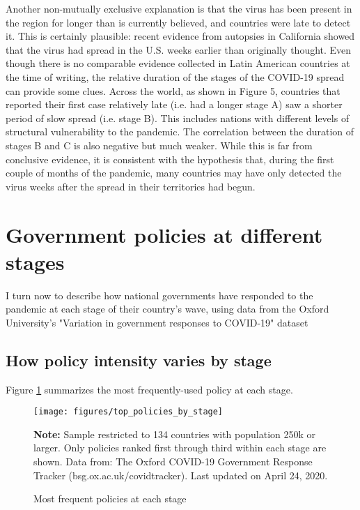 \documentclass[12pt,english]{article}
\begin{document}
Another non-mutually exclusive explanation is that the virus has been present in the region for longer than is currently believed, and countries were late to detect it. This is certainly plausible: recent evidence from autopsies in California showed that the virus had spread in the U.S. weeks earlier than originally thought. Even though there is no comparable evidence collected in Latin American countries at the time of writing, the relative duration of the stages of the COVID-19 spread can provide some clues. Across the world, as shown in Figure 5, countries that reported their first case relatively late (i.e. had a longer stage A) saw a shorter period of slow spread (i.e. stage B). This includes nations with different levels of structural vulnerability to the pandemic.  The correlation between the duration of stages B and C is also negative but much weaker. While this is far from conclusive evidence, it is consistent with the hypothesis that, during the first couple of months of the pandemic, many countries may have only detected the virus weeks after the spread in their territories had begun.



\section{Government policies at different stages \label{sec:Policies}}

I turn now to describe how national governments have responded to the pandemic at each stage of their country's wave, using data from the Oxford University's "Variation in government responses to COVID-19" dataset  \citep{Hale2020}

\subsection{How policy intensity varies by stage \label{subsec:Policies-by-stage}}

Figure \ref{fig:policies_by_stage} summarizes the most frequently-used policy at each stage.

\begin{figure}[H]
	\singlespacing
	\centering
	 \caption{Most frequent policies at each stage}  \label{fig:policies_by_stage}
	\resizebox{0.7\width}{!} {
		\begin{threeparttable}

 			  \texttt{[image: figures/top\_policies\_by\_stage]}
  			 \begin{tablenotes}[flushleft]\vspace*{-7bp}
			\item \textbf{Note:} Sample restricted to 134 countries with population 250k or larger. Only policies ranked first through third within each stage are shown. Data from: The Oxford COVID-19 Government Response Tracker (bsg.ox.ac.uk/covidtracker). Last updated on April 24, 2020.
			 \end{tablenotes}
  		\end{threeparttable}
 		}
  	 \onehalfspacing
\end{figure}
\end{document}
